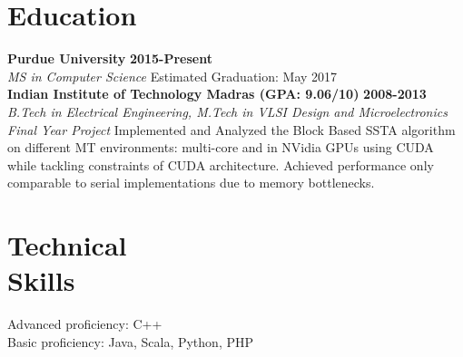 \documentclass[margin,line]{resume}
\begin{document}
\begin{resume}

\section{\mysidestyle Education}
\textbf{Purdue University} \hfill \textbf{2015-Present} \\
\emph{MS in Computer Science} \hfill Estimated Graduation: May 2017
    \vspace{2mm} \\
\textbf{Indian Institute of Technology Madras (GPA: 9.06/10) } \hfill \textbf{2008-2013} \\
\emph{B.Tech in Electrical Engineering, M.Tech in VLSI Design and Microelectronics} \\
\emph{Final Year Project} Implemented and Analyzed the Block Based SSTA algorithm on different MT environments:  multi-core and in NVidia GPUs using CUDA while tackling constraints of CUDA architecture. Achieved performance only comparable to serial implementations due to memory bottlenecks.

\section{\mysidestyle Technical \\ Skills} 
Advanced proficiency: C++ \\
Basic proficiency: Java, Scala, Python, PHP



\end{resume}
\end{document}
